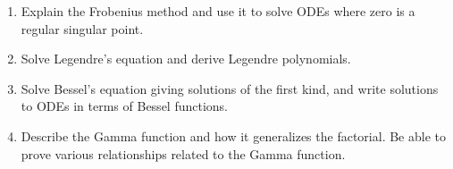
\begin{enumerate}
\item Explain the Frobenius method and use it to solve ODEs where zero is a regular singular point.
\item Solve Legendre's equation and derive Legendre polynomials.
\item Solve Bessel's equation giving solutions of the first kind, and write solutions to ODEs in terms of Bessel functions.
\item Describe the Gamma function and how it generalizes the factorial. Be able to prove various relationships related to the Gamma function.
\end{enumerate}

